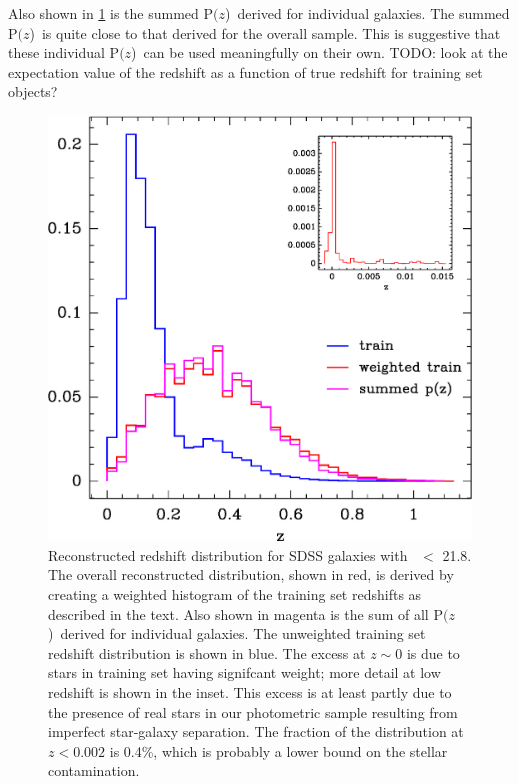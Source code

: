 \documentclass[preprint]{aastex}
\newcommand{\rmax}{21.8}
\newcommand{\pofz}{P$(z$)}
\begin{document}
Also shown in \ref{fig:pofz} is the summed \pofz\ derived for individual
galaxies.  The summed \pofz\ is quite close to that derived for the overall
sample.  This is suggestive that these individual \pofz\ can be used
meaningfully on their own.  TODO: look at the expectation value of the redshift
as a function of true redshift for training set objects?

\begin{figure}[t] \centering
    \includegraphics[scale=0.9]{figures/zweight-09-zhist-withorig-withsum-11.eps}

    \caption{Reconstructed redshift distribution for SDSS galaxies with \rmag\
    $ < $ \rmax.  The overall reconstructed distribution, shown in red, is
    derived by creating a weighted histogram of the training set redshifts as
    described in the text.  Also shown in magenta is the sum of all \pofz\
    derived for individual galaxies.  The unweighted training set redshift
    distribution is shown in blue.  The excess at $z \sim 0$ is due to stars in
    training set having signifcant weight; more detail at low redshift is shown
    in the inset.  This excess is at least partly due to the presence of real
    stars in our photometric sample resulting from imperfect star-galaxy
    separation.  The fraction of the distribution at $z < 0.002$ is 0.4\%,
    which is probably a lower bound on the stellar contamination.
    \label{fig:pofz}}

    \vspace{2em}
\end{figure}
\end{document}
